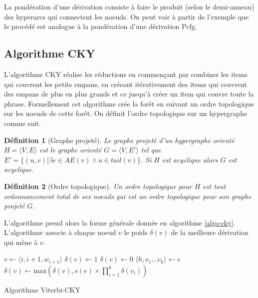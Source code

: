 \documentclass[11pt,openany]{book}
\newtheorem{definition}{Définition}[chapter]
\begin{document}
La pondération d'une dérivation consiste à faire le produit (selon le demi-anneau) des hyperarcs qui connectent les noeuds. 
On peut voir à partir de l'exemple que le procédé est analogue à la pondération d'une dérivation {\sc Pcfg}.


\subsection{Algorithme CKY}

L'algorithme CKY réalise les réductions en commençant par combiner les items qui couvrent les petits empans, en créeant itérativement des items qui 
couvrent des empans de plus en plus grands et ce jusqu'à créer un item qui couvre toute la phrase.
Formellement cet algorithme crée la forêt en suivant un ordre topologique sur les noeuds de cette forêt.
On définit l'ordre topologique sur un hypergraphe comme suit.

\begin{definition}[Graphe projeté]
Le graphe projeté d'un hypergraphe orienté $H=\langle V, E\rangle$ est le graphe orienté $G=\langle V,E'\rangle$
tel que $E' = \{(u,v) | \exists e \in AE(v) \land u \in tail(v) \}$. Si $H$ est acyclique alors $G$ est acyclique.
\end{definition}

\begin{definition}[Ordre topologique]
Un ordre topologique pour $H$ est tout ordonnancement total de ses noeuds 
qui est un ordre topologique pour son graphe projeté $G$.
\end{definition}

L'algorithme prend alors la forme générale donnée en algorithme \ref{algo-cky}.
L'algorithme associe à chaque noeud $v$ le poids $\delta(v)$ de la meilleure dérivation qui mène à $v$.

\begin{algorithm}
\begin{algorithmic}[htbp]
\State $v \gets \langle i,i+1,w_{i+1} \rangle$
\State $\delta(v) \gets 1$
\EndFor
{}
\State $\delta (v) \gets 0$
\State $\langle h, v_1\ldots v_k\rangle \gets e$
\State $\delta(v) \gets \text{max} \left(\delta(v) , s(e) \times
\prod_{i=1}^k \delta(v_i)\right)$
\EndFor
\EndFor
\EndFunction
\end{algorithmic}
\caption{\label{algo-cky} Algorithme Viterbi-CKY}
\end{algorithm}
\end{document}
